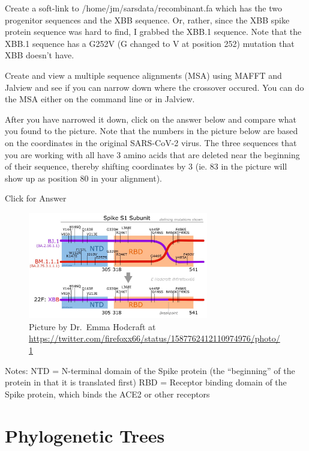 \documentclass[
]{book}
\begin{document}
Create a soft-link to /home/jm/sarsdata/recombinant.fa which has the two progenitor sequences and the XBB sequence. Or, rather, since the XBB spike protein sequence was hard to find, I grabbed the XBB.1 sequence. Note that the XBB.1 sequence has a G252V (G changed to V at position 252) mutation that XBB doesn't have.

Create and view a multiple sequence alignments (MSA) using MAFFT and Jalview and see if you can narrow down where the crossover occured. You can do the MSA either on the command line or in Jalview.

After you have narrowed it down, click on the answer below and compare what you found to the picture. Note that the numbers in the picture below are based on the coordinates in the original SARS-CoV-2 virus. The three sequences that you are working with all have 3 amino acids that are deleted near the beginning of their sequence, thereby shifting coordinates by 3 (ie. 83 in the picture will show up as position 80 in your alignment).

Click for Answer

\begin{figure}
\centering
\includegraphics[width=0.7\textwidth,height=\textheight]{./Figures/recomb.jpeg}
\caption{Picture by Dr.~Emma Hodcraft at \url{https://twitter.com/firefoxx66/status/1587762412110974976/photo/1}}
\end{figure}

Notes:
NTD = N-terminal domain of the Spike protein (the ``beginning'' of the protein in that it is translated first)
RBD = Receptor binding domain of the Spike protein, which binds the ACE2 or other receptors

\hfill\break

\hypertarget{phylogenetic-trees}{%
\chapter{Phylogenetic Trees}\label{phylogenetic-trees}}
\end{document}
